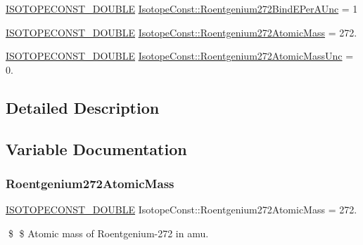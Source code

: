 \begin{DoxyCompactItemize}
\item 
\mbox{\hyperlink{group___isotope_const-_macros_ga8f45a7272ce02c0b4c65c44636ed719a}{I\+S\+O\+T\+O\+P\+E\+C\+O\+N\+S\+T\+\_\+\+D\+O\+U\+B\+LE}} \mbox{\hyperlink{group___isotope_const-_roentgenium-_rg272_ga658fda778d997b04682d6fed2a9eae9a}{Isotope\+Const\+::\+Roentgenium272\+Bind\+E\+Per\+A\+Unc}} = 1
\item 
\mbox{\hyperlink{group___isotope_const-_macros_ga8f45a7272ce02c0b4c65c44636ed719a}{I\+S\+O\+T\+O\+P\+E\+C\+O\+N\+S\+T\+\_\+\+D\+O\+U\+B\+LE}} \mbox{\hyperlink{group___isotope_const-_roentgenium-_rg272_ga89ab6413cf2ff8b1c619e92ece7b4aa5}{Isotope\+Const\+::\+Roentgenium272\+Atomic\+Mass}} = 272.
\item 
\mbox{\hyperlink{group___isotope_const-_macros_ga8f45a7272ce02c0b4c65c44636ed719a}{I\+S\+O\+T\+O\+P\+E\+C\+O\+N\+S\+T\+\_\+\+D\+O\+U\+B\+LE}} \mbox{\hyperlink{group___isotope_const-_roentgenium-_rg272_ga68fc4c03161c61872bdd8191bff76e89}{Isotope\+Const\+::\+Roentgenium272\+Atomic\+Mass\+Unc}} = 0.
\end{DoxyCompactItemize}


\subsection{Detailed Description}


\subsection{Variable Documentation}
\mbox{\label{group___isotope_const-_roentgenium-_rg272_ga89ab6413cf2ff8b1c619e92ece7b4aa5}} 
\subsubsection{\texorpdfstring{Roentgenium272\+Atomic\+Mass}{Roentgenium272AtomicMass}}
{\footnotesize\ttfamily \mbox{\hyperlink{group___isotope_const-_macros_ga8f45a7272ce02c0b4c65c44636ed719a}{I\+S\+O\+T\+O\+P\+E\+C\+O\+N\+S\+T\+\_\+\+D\+O\+U\+B\+LE}} Isotope\+Const\+::\+Roentgenium272\+Atomic\+Mass = 272.}

\$ \$ Atomic mass of Roentgenium-\/272 in amu. \mbox{\label{group___isotope_const-_roentgenium-_rg272_ga68fc4c03161c61872bdd8191bff76e89}} 
